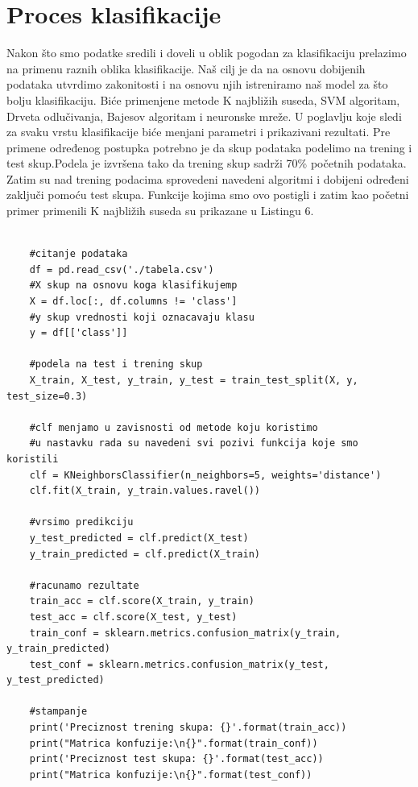 \documentclass[14pt]{extarticle}
\begin{document}
\section{Proces klasifikacije}
\label{Klasifikacija}

Nakon što smo podatke sredili i doveli u oblik pogodan za klasifikaciju prelazimo na primenu raznih oblika klasifikacije. Naš cilj je da na osnovu dobijenih podataka utvrdimo zakonitosti i na osnovu njih istreniramo naš model za što bolju klasifikaciju. Biće primenjene metode K najbližih suseda, SVM algoritam, Drveta odlučivanja, Bajesov algoritam i neuronske mreže. U poglavlju koje sledi za svaku vrstu klasifikacije biće menjani parametri i prikazivani rezultati. Pre primene određenog postupka potrebno je da skup podataka podelimo na trening i test skup.Podela je izvršena tako da trening skup sadrži 70\% početnih podataka. Zatim su nad trening podacima sprovedeni navedeni algoritmi i dobijeni određeni zaključi pomoću test skupa. Funkcije kojima smo ovo postigli i zatim kao početni primer primenili K najbližih suseda su prikazane u Listingu 6. \cite{vi2} \cite{vi}

\begin{lstlisting}[caption={Klasifikacija},frame=single, label=simple]

    #citanje podataka
    df = pd.read_csv('./tabela.csv')
    #X skup na osnovu koga klasifikujemp
    X = df.loc[:, df.columns != 'class']
    #y skup vrednosti koji oznacavaju klasu
    y = df[['class']]

    #podela na test i trening skup
    X_train, X_test, y_train, y_test = train_test_split(X, y, test_size=0.3)

    #clf menjamo u zavisnosti od metode koju koristimo
    #u nastavku rada su navedeni svi pozivi funkcija koje smo koristili
    clf = KNeighborsClassifier(n_neighbors=5, weights='distance')
    clf.fit(X_train, y_train.values.ravel())
    
    #vrsimo predikciju
    y_test_predicted = clf.predict(X_test)
    y_train_predicted = clf.predict(X_train)
    
    #racunamo rezultate
    train_acc = clf.score(X_train, y_train)
    test_acc = clf.score(X_test, y_test)
    train_conf = sklearn.metrics.confusion_matrix(y_train, y_train_predicted)
    test_conf = sklearn.metrics.confusion_matrix(y_test, y_test_predicted)  
    
    #stampanje
    print('Preciznost trening skupa: {}'.format(train_acc))
    print("Matrica konfuzije:\n{}".format(train_conf))
    print('Preciznost test skupa: {}'.format(test_acc))
    print("Matrica konfuzije:\n{}".format(test_conf))


\end{lstlisting}
\end{document}
